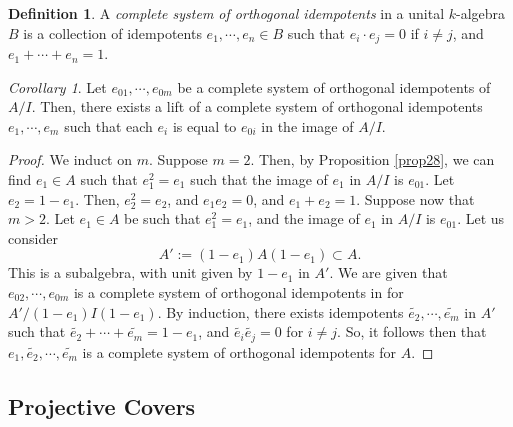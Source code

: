 \documentclass[a4paper]{report}
\theoremstyle{definition}
\newtheorem{definition}{Definition}
\theoremstyle{remark}
\theoremstyle{proposition}
\theoremstyle{conjecture}
\theoremstyle{lemma}
\theoremstyle{corollary}
\newtheorem{corollary}{Corollary}
\theoremstyle{exercise}
\theoremstyle{example}
\begin{document}
\begin{definition}
    A \emph{complete system of orthogonal idempotents} in a unital $k$-algebra 
    $B$ is a collection of idempotents $e_1,\cdots,e_n \in B$ such that 
    $e_i\cdot e_j = 0$ if $i\neq j$, and $e_1 + \cdots + e_n = 1$.
\end{definition}

\begin{corollary}\label{cor23}
    Let $e_{01},\cdots, e_{0m}$ be a complete system of orthogonal idempotents
    of $A/I$. Then, there exists a lift of a complete system of orthogonal 
    idempotents $e_1,\cdots,e_m$ such that each $e_i$ is equal to $e_{0i}$
    in the image of $A/I$.
\end{corollary}

\begin{proof}
    We induct on $m$. Suppose $m=2$. Then, by Proposition \ref{prop28}, 
    we can find $e_1 \in A$ such that $e_1^2 = e_1$
    such that the image of $e_1$ in $A/I$ is $e_{01}$. Let 
    $e_2 = 1-e_1$. Then, $e_2^2 = e_2$, and $e_1e_2 = 0$, and $e_1+e_2=1$.
    Suppose now that $m > 2$. Let $e_1 \in A$ be such that $e_1^2 = e_1$, and
    the image of $e_1$ in $A/I$ is $e_{01}$.
    Let us consider $$A' := (1-e_1)A(1-e_1) \subset A.$$
    This is a subalgebra, with unit given by $1-e_1$ in $A'$.
    We are given that $e_{02},\cdots,e_{0m}$ is a complete system of 
    orthogonal idempotents in for $A'/(1-e_1)I(1-e_1)$. By induction, 
    there exists idempotents $\widetilde{e_2},\cdots,\widetilde{e_m}$ in $A'$
    such that $\widetilde{e_2} + \cdots + \widetilde{e_m} = 1-e_1$,
    and $\widetilde{e_i}\widetilde{e_j} = 0$ for $i\neq j$. 
    So, it follows then that $e_1,\widetilde{e_2},\cdots,\widetilde{e_m}$
    is a complete system of orthogonal idempotents for $A$.
\end{proof}

\subsection{Projective Covers}
\end{document}
